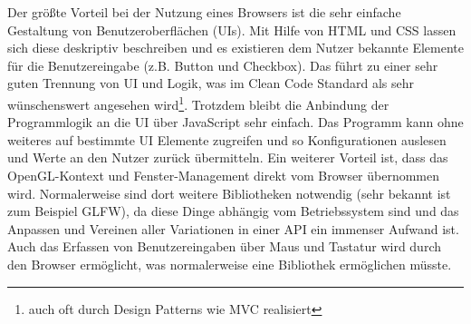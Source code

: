 Der größte Vorteil bei der Nutzung eines Browsers ist die sehr einfache Gestaltung von Benutzeroberflächen (UIs). Mit Hilfe von HTML und CSS lassen sich diese deskriptiv beschreiben und es existieren dem Nutzer bekannte Elemente für die Benutzereingabe (z.B. Button und Checkbox). Das führt zu einer sehr guten Trennung von UI und Logik, was im Clean Code Standard als sehr wünschenswert angesehen wird\footnote{auch oft durch Design Patterns wie MVC realisiert}. Trotzdem bleibt die Anbindung der Programmlogik an die UI über JavaScript sehr einfach. Das Programm kann ohne weiteres auf bestimmte UI Elemente zugreifen und so Konfigurationen auslesen und Werte an den Nutzer zurück übermitteln. Ein weiterer Vorteil ist, dass das OpenGL-Kontext und Fenster-Management direkt vom Browser übernommen wird. Normalerweise sind dort weitere Bibliotheken notwendig (sehr bekannt ist zum Beispiel GLFW), da diese Dinge abhängig vom Betriebssystem sind und das Anpassen und Vereinen aller Variationen in einer API ein immenser Aufwand ist. Auch das Erfassen von Benutzereingaben über Maus und Tastatur wird durch den Browser ermöglicht, was normalerweise eine Bibliothek ermöglichen müsste.

